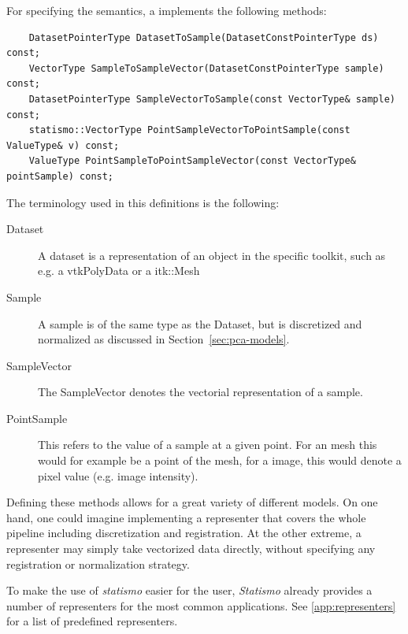 \documentclass{InsightArticle}
\newcommand{\statismo}{\emph{statismo}\xspace}
\newcommand{\Statismo}{\emph{Statismo}\xspace}
\begin{document}
For specifying the semantics, a  implements the following methods:
\begin{verbatim}
	DatasetPointerType DatasetToSample(DatasetConstPointerType ds) const;
	VectorType SampleToSampleVector(DatasetConstPointerType sample) const;
	DatasetPointerType SampleVectorToSample(const VectorType& sample) const;
	statismo::VectorType PointSampleVectorToPointSample(const ValueType& v) const;
	ValueType PointSampleToPointSampleVector(const VectorType& pointSample) const;
\end{verbatim}
The terminology used in this definitions is the following: 
\begin{description}
  \item[Dataset] A dataset is a representation of an object in the specific toolkit, such as e.g. a vtkPolyData or a itk::Mesh
  \item[Sample] A sample is of the same type as the Dataset, but is discretized and normalized as discussed in Section~\ref{sec:pca-models}. 
  \item[SampleVector] The SampleVector denotes the vectorial representation of a sample.
  \item[PointSample] This refers to the value of a sample at a given point. For an mesh this would for example be a point of the mesh, for a  image, this would denote a pixel value (e.g. image intensity).
  \end{description}
  
  Defining these methods allows for a great variety of different models. On one
  hand, one could imagine implementing a representer that covers the whole
  pipeline including discretization and registration. At the other extreme, a representer may simply take vectorized data directly, without specifying any registration or normalization strategy.

To make the use of \statismo easier for the user, \Statismo already provides a number of representers for the most common applications. See \ref{app:representers} for a list of predefined representers. 
\end{document}
